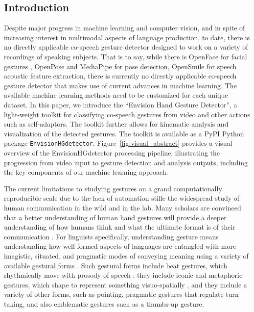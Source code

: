 \documentclass[11pt,smallheadings,cleardoublepage=empty,tocflat,numbers=noenddot,twoside,captions=tableheading]{scrbook}
\begin{document}
\begin{refsection}
\section{Introduction}
Despite major progress in machine learning and computer vision, and in spite of increasing interest in multimodal aspects of language production, to date, there is no directly applicable co-speech gesture detector designed to work on a variety of recordings of speaking subjects. That is to say, while there is OpenFace for facial gestures \parencite{baltrusaitisOpenFaceOpenSource2016}, OpenPose \parencite{caoOpenPoseRealtimeMultiPerson2021} and MediaPipe \parencite{caoOpenPoseRealtimeMultiPerson2021} for pose detection, OpenSmile \parencite{eybenOpensmileMunichVersatile2010} for speech acoustic feature extraction, there is currently no directly applicable co-speech gesture detector that makes use of current advances in machine learning. The available machine learning methods need to be customized for each unique dataset. In this paper, we introduce the ``Envision Hand Gesture Detector'', a light-weight toolkit for classifying co-speech gestures from video and other actions such as self-adaptors. The toolkit further allows for kinematic analysis and visualization of the detected gestures. The toolkit is available as a PyPI Python package \texttt{EnvisionHGdetector}. Figure~\ref{fig:visual_abstract} provides a visual overview of the EnvisionHGdetector processing pipeline, illustrating the progression from video input to gesture detection and analysis outputs, including the key components of our machine learning approach.

The current limitations to studying gestures on a grand computationally reproducible scale due to the lack of automation stifle the widespread study of human communication in the wild and in the lab. Many scholars are convinced that a better understanding of human hand gestures will provide a deeper understanding of how humans think and what the ultimate format is of their communication \parencite{feyereisenCognitivePsychologySpeechrelated2017, kendonGestureVisibleAction2004,mcneillHandMindWhat1992, goldin-meadowGestureSignLanguage2017, mcneillHandMindWhat1992}. For linguists specifically, understanding gesture means understanding how well-formed aspects of languages are entangled with more imagistic, situated, and pragmatic modes of conveying meaning using a variety of available gestural forms \parencite{alviarMultimodalCoordinationPragmatic2023, murgianoSituatingLanguageRealworld2021}. Such gestural forms include beat gestures, which rhythmically move with prosody of speech \parencite{wagnerGestureSpeechInteraction2014}; they include iconic and metaphoric gestures, which shape to represent something visuo-spatially \parencite{streeckDepictingGesture2008}, and they include a variety of other forms, such as pointing, pragmatic gestures that regulate turn taking, and also emblematic gestures such as a thumbs-up gesture.


\end{refsection}
\end{document}
